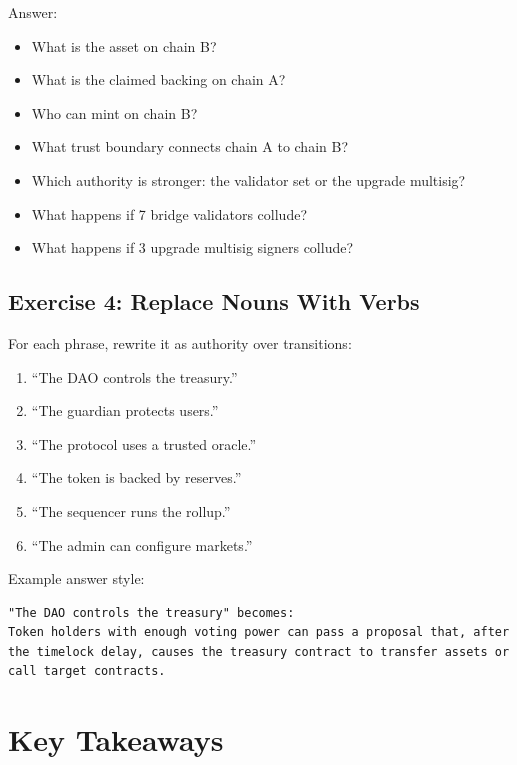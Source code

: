 Answer:

\begin{itemize}
\tightlist
\item
  What is the asset on chain B?
\item
  What is the claimed backing on chain A?
\item
  Who can mint on chain B?
\item
  What trust boundary connects chain A to chain B?
\item
  Which authority is stronger: the validator set or the upgrade
  multisig?
\item
  What happens if 7 bridge validators collude?
\item
  What happens if 3 upgrade multisig signers collude?
\end{itemize}

\subsection{Exercise 4: Replace Nouns With Verbs}

For each phrase, rewrite it as authority over transitions:

\begin{enumerate}
\def\labelenumi{\arabic{enumi}.}
\tightlist
\item
  ``The DAO controls the treasury.''
\item
  ``The guardian protects users.''
\item
  ``The protocol uses a trusted oracle.''
\item
  ``The token is backed by reserves.''
\item
  ``The sequencer runs the rollup.''
\item
  ``The admin can configure markets.''
\end{enumerate}

Example answer style:

\begin{lstlisting}
"The DAO controls the treasury" becomes:
Token holders with enough voting power can pass a proposal that, after the timelock delay, causes the treasury contract to transfer assets or call target contracts.
\end{lstlisting}

\section{Key Takeaways}

